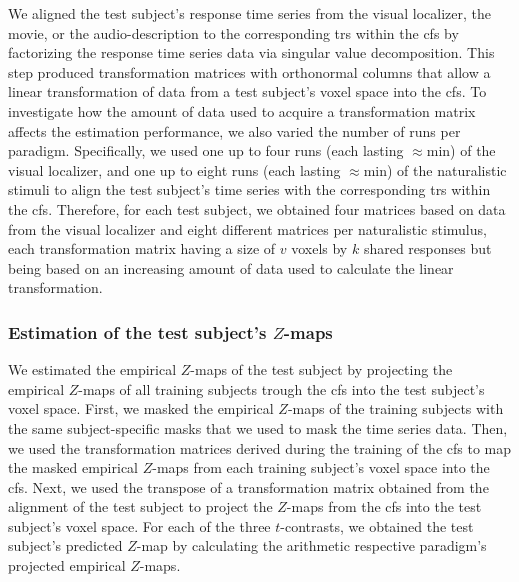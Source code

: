 %
We aligned the test subject's response time series from the visual localizer,
the movie, or the audio-description to the corresponding \acp{tr} within the
\ac{cfs} by factorizing the response time series data via singular value
decomposition.
%
This step produced transformation matrices with orthonormal columns that allow a
linear transformation of data from a test subject's voxel space into the
\ac{cfs}.
%
To investigate how the amount of data used to acquire a transformation matrix
affects the estimation performance, we also varied the number of runs per
paradigm.
%
Specifically, we used
%
one up to four runs (each lasting $\approx$\unit[5]{min}) of the visual
localizer, and
%
one up to eight runs (each lasting $\approx$\unit[15]{min}) of the naturalistic
stimuli
%
to align the test subject's time series with the corresponding \acp{tr} within
the \ac{cfs}.
%
Therefore, for each test subject, we obtained four matrices based on data from
the visual localizer and eight different matrices per naturalistic stimulus,
each transformation matrix having a size of $v$ voxels by $k$ shared responses
but being based on an increasing amount of data used to calculate the linear
transformation.


\subsubsection{Estimation of the test subject's $Z$-maps}

We estimated the empirical $Z$-maps of the test subject by projecting the
empirical $Z$-maps of all training subjects trough the \ac{cfs} into the test
subject's voxel space.
First, we masked the empirical $Z$-maps of the training subjects with the same
subject-specific masks that we used to mask the time series data.
%
Then, we used the transformation matrices derived during the training of the
\ac{cfs} to map the masked empirical $Z$-maps from each training subject's voxel
space into the \ac{cfs}.
%
Next, we used the transpose of a transformation matrix obtained from the
alignment of the test subject to project the $Z$-maps from the \ac{cfs} into the
test subject's voxel space.
For each of the three $t$-contrasts, we obtained the test subject's predicted
$Z$-map by calculating the arithmetic respective paradigm's projected empirical
$Z$-maps.



